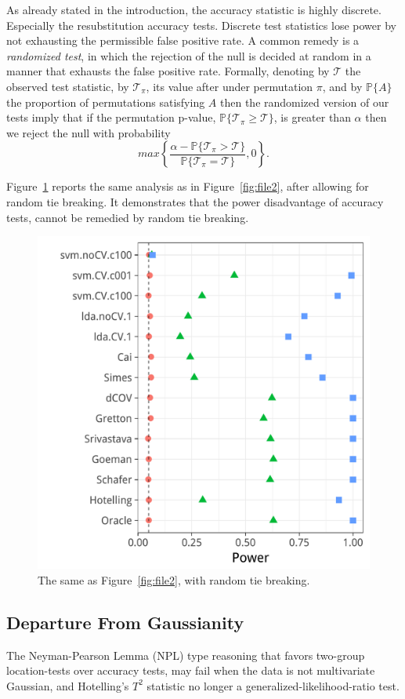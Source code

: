 \documentclass[journal]{IEEEtran}
\begin{document}
As already stated in the introduction, the accuracy statistic is highly discrete. 
Especially the resubstitution accuracy tests. 
Discrete test statistics lose power by not exhausting the permissible false positive rate. 
A common remedy is a \emph{randomized test}, in which the rejection of the null is decided at random in a manner that exhausts the false positive rate. 
Formally, denoting by $\mathcal{T}$ the observed test statistic, by $\mathcal{T}_\pi$, its value after under permutation $\pi$, and by $\mathbb{P}\{A\}$ the proportion of permutations satisfying $A$ then the randomized version of our tests imply that if the permutation p-value, 
$\mathbb{P}\{\mathcal{T}_\pi \geq \mathcal{T}\}$, 
is greater than  $\alpha$ then we reject the null with probability 
$$ max\left\{\frac{\alpha - \mathbb{P}\{\mathcal{T}_\pi > \mathcal{T}\}}{\mathbb{P}\{\mathcal{T}_\pi = \mathcal{T}\}},0 \right\}.$$

Figure~\ref{fig:file33} reports the same analysis as in Figure~\ref{fig:file2}, after allowing for random tie breaking. 
It demonstrates that the power disadvantage of accuracy tests, cannot be remedied by random tie breaking.

\begin{figure}[ht]
	\centering
	\includegraphics[width=0.5\columnwidth]{art/file33}
	\caption{The same as Figure~\ref{fig:file2}, with random tie breaking.}
	\label{fig:file33}
\end{figure}



\subsection{Departure From Gaussianity}
The Neyman-Pearson Lemma (NPL) type reasoning that favors two-group location-tests over accuracy tests, may fail when the data is not multivariate Gaussian, and Hotelling's $T^2$ statistic no longer a generalized-likelihood-ratio test. 
\end{document}
